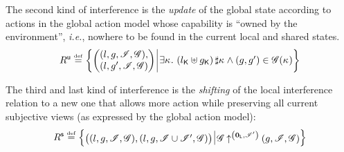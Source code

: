 The second kind of interference is the \emph{update} of the global
state according to actions in the global action model whose capability
is ``owned by the environment'', \textit{i.e.}, nowhere to be found
in the current local and shared states.
\vspace{-1ex}
\[	
  \updateR \eqdef
  \left\{
  \begin{array}{@{} l @{\hspace*{2pt}} | @{\hspace*{2pt}} r @{}}
    \left(
    \begin{array}{@{} l @{}}
      (l, g, \lmod, \gmod),\\
      (l, g', \lmod, \gmod)
    \end{array}
    \right)
    &
    \begin{array}{@{} l @{} }
      \begin{array}{@{} l @{}}
	\exsts{\ca{} }\left( \capPart{l} \composeCap \capPart{g} \right) \disjoint \ca{} \land 
	(g, g') \in \gmod(\ca{}) \\
      \end{array}	
    \end{array}
  \end{array}
  \right\}
\]	

The third and last kind of interference is the \emph{shifting} of the
local interference relation to a new one that allows more action while
preserving all current subjective views (as expressed by the global
action model):
\vspace{-1ex}
\[
  \shiftR \eqdef
  \left\{
  \begin{array}{@{} l @{\hspace*{2pt}} | @{\hspace*{2pt}} r @{}}
    \left(
    \begin{array}{@{} l @{}}
      (l, g, \lmod, \gmod),
      \left( l, g, \lmod \cup \lmod', \gmod \right)
    \end{array}
    \right)
    &
    \expandsAM{\gmod}{\unitL}{\lmod'}{g}{\lmod}{\gmod}
  \end{array}
  \right\}
\]


